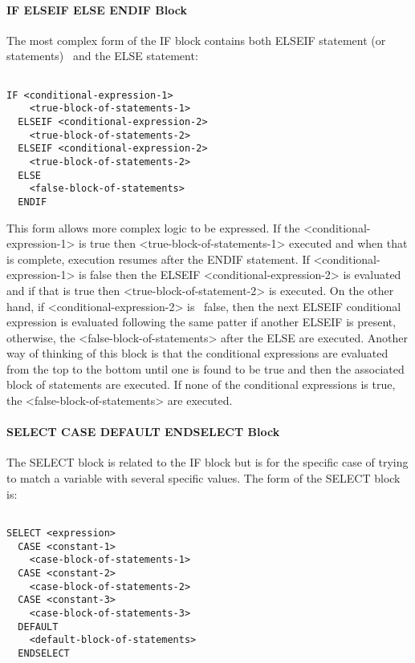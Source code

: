 \paragraph{IF ELSEIF ELSE ENDIF Block}\label{if-elseif-else-endif-block}

The most complex form of the IF block contains both ELSEIF statement (or statements)~ and the ELSE statement:

\begin{lstlisting}

IF <conditional-expression-1>
    <true-block-of-statements-1>
  ELSEIF <conditional-expression-2>
    <true-block-of-statements-2>
  ELSEIF <conditional-expression-2>
    <true-block-of-statements-2>
  ELSE
    <false-block-of-statements>
  ENDIF
\end{lstlisting}

This form allows more complex logic to be expressed. If the \textless{}conditional-expression-1\textgreater{} is true then \textless{}true-block-of-statements-1\textgreater{} executed and when that is complete, execution resumes after the ENDIF statement. If \textless{}conditional-expression-1\textgreater{} is false then the ELSEIF \textless{}conditional-expression-2\textgreater{} is evaluated and if that is true then \textless{}true-block-of-statement-2\textgreater{} is executed. On the other hand, if \textless{}conditional-expression-2\textgreater{} is~ false, then the next ELSEIF conditional expression is evaluated following the same patter if another ELSEIF is present, otherwise, the \textless{}false-block-of-statements\textgreater{} after the ELSE are executed. Another way of thinking of this block is that the conditional expressions are evaluated from the top to the bottom until one is found to be true and then the associated block of statements are executed. If none of the conditional expressions is true, the \textless{}false-block-of-statements\textgreater{} are executed.

\paragraph{SELECT CASE DEFAULT ENDSELECT Block}\label{select-case-default-endselect-block}

The SELECT block is related to the IF block but is for the specific case of trying to match a variable with several specific values. The form of the SELECT block is:

\begin{lstlisting}

SELECT <expression>
  CASE <constant-1>
    <case-block-of-statements-1>
  CASE <constant-2>
    <case-block-of-statements-2>
  CASE <constant-3>
    <case-block-of-statements-3>
  DEFAULT
    <default-block-of-statements>
  ENDSELECT
\end{lstlisting}

